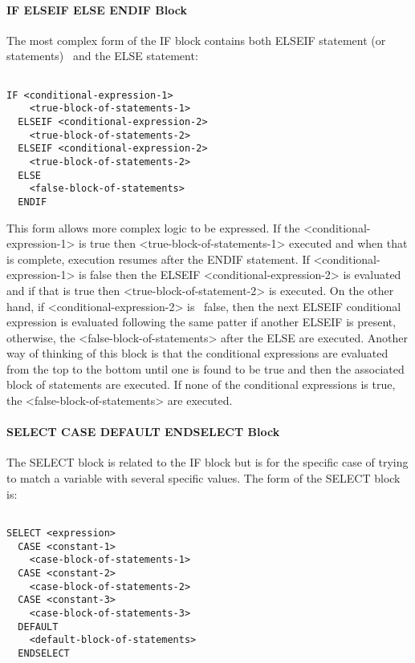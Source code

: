 \paragraph{IF ELSEIF ELSE ENDIF Block}\label{if-elseif-else-endif-block}

The most complex form of the IF block contains both ELSEIF statement (or statements)~ and the ELSE statement:

\begin{lstlisting}

IF <conditional-expression-1>
    <true-block-of-statements-1>
  ELSEIF <conditional-expression-2>
    <true-block-of-statements-2>
  ELSEIF <conditional-expression-2>
    <true-block-of-statements-2>
  ELSE
    <false-block-of-statements>
  ENDIF
\end{lstlisting}

This form allows more complex logic to be expressed. If the \textless{}conditional-expression-1\textgreater{} is true then \textless{}true-block-of-statements-1\textgreater{} executed and when that is complete, execution resumes after the ENDIF statement. If \textless{}conditional-expression-1\textgreater{} is false then the ELSEIF \textless{}conditional-expression-2\textgreater{} is evaluated and if that is true then \textless{}true-block-of-statement-2\textgreater{} is executed. On the other hand, if \textless{}conditional-expression-2\textgreater{} is~ false, then the next ELSEIF conditional expression is evaluated following the same patter if another ELSEIF is present, otherwise, the \textless{}false-block-of-statements\textgreater{} after the ELSE are executed. Another way of thinking of this block is that the conditional expressions are evaluated from the top to the bottom until one is found to be true and then the associated block of statements are executed. If none of the conditional expressions is true, the \textless{}false-block-of-statements\textgreater{} are executed.

\paragraph{SELECT CASE DEFAULT ENDSELECT Block}\label{select-case-default-endselect-block}

The SELECT block is related to the IF block but is for the specific case of trying to match a variable with several specific values. The form of the SELECT block is:

\begin{lstlisting}

SELECT <expression>
  CASE <constant-1>
    <case-block-of-statements-1>
  CASE <constant-2>
    <case-block-of-statements-2>
  CASE <constant-3>
    <case-block-of-statements-3>
  DEFAULT
    <default-block-of-statements>
  ENDSELECT
\end{lstlisting}

